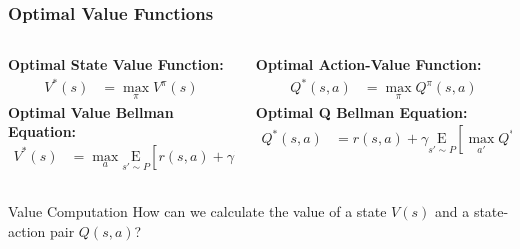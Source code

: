 \begin{frame}
    \frametitle{Optimal Value Functions}
    
    \begin{columns}[T]
        \begin{column}{0.5\textwidth}
            \textbf{Optimal State Value Function:}
            \begin{align*}
                V^{*}(s) &= \underset{\pi}{\max} V^{\pi}(s)
            \end{align*}
            \vspace{0.1cm}
            \textbf{Optimal Value Bellman Equation:}
            \begin{align*}
                V^{*}(s) &= \max_a \underset{s'\sim P}{\mathrm{E}} \left[ r(s,a) + \gamma V^{*}(s') \right]
            \end{align*}
        \end{column}
        
        \begin{column}{0.5\textwidth}
            \textbf{Optimal Action-Value Function:}
            \begin{align*}
                Q^{*}(s,a) &= \underset{\pi}{\max} Q^{\pi}(s,a)
            \end{align*}
            \vspace{0.1cm}
            \textbf{Optimal Q Bellman Equation:}
            \begin{align*}
                Q^{*}(s,a) &= r(s,a) + \gamma \underset{s'\sim P}{\mathrm{E}} \left[ \max_{a'} Q^{*}(s',a') \right]
            \end{align*}
        \end{column}
    \end{columns}
    
    \begin{minipage}{0.83\textwidth}
    \begin{block}{Value Computation}
        How can we calculate the value of a state $V(s)$ 
        and a state-action pair $Q(s,a)$?
    \end{block}
\end{minipage}

\end{frame}

